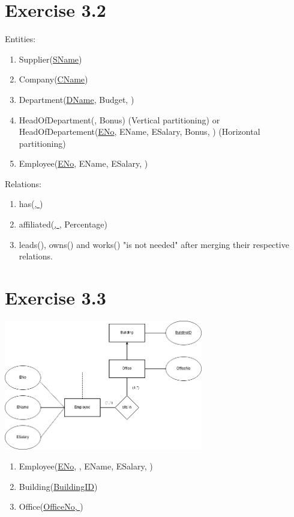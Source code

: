 \documentclass{article} %
\newcommand{\homeworkNumber}{3}
\begin{document}
\section*{Exercise \homeworkNumber.2}

\noindent
Entities:
\begin{enumerate}[-]
\item Supplier(\underline{SName})
\item Company(\underline{CName})
\item Department(\underline{DName},  Budget, )
\item HeadOfDepartment(\underline{}, Bonus) (Vertical partitioning) or\\ HeadOfDepartement(\underline{ENo}, EName, ESalary, Bonus, ) (Horizontal partitioning)
\item Employee(\underline{ENo}, EName, ESalary, )
\end{enumerate}

\noindent
Relations:
\begin{enumerate}[-]
\item has(\underline{, })
\item affiliated(\underline{, }, Percentage)
\item leads(), owns() and works() "is not needed" after merging their respective relations.

\end{enumerate}

\section*{Exercise \homeworkNumber.3}

\begin{center}
\includegraphics[width=0.65\textwidth]{sheet_3_ex_3.drawio.png}
\end{center}
\begin{enumerate}[-]
\item Employee(\underline{ENo}, , EName, ESalary, )

\item Building(\underline{BuildingID})
\item Office(\underline{OfficeNo, })
\end{enumerate}
\end{document}
